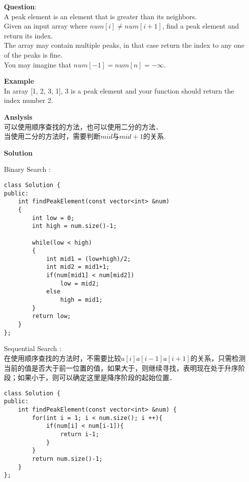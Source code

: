    
\begin{description}
    \item{\textbf{Question}}:\\%
		A peak element is an element that is greater than its neighbors.\\
		Given an input array where $num[i] \neq num[i+1]$, find a peak element and return its index.\\
		The array may contain multiple peaks, in that case return the index to any one of the peaks is fine.\\
		You may imagine that $num[-1] = num[n] = -∞$.
    \item{\textbf{Example}}\\
		In array [1, 2, 3, 1], 3 is a peak element and your function should return the index number 2.
    \item{\textbf{Anslysis}}\\
		可以使用顺序查找的方法，也可以使用二分的方法．\\
		当使用二分的方法时，需要判断$mid$与$mid + 1$的关系.\\

    \item{\textbf{Solution}}\\
	\item{Binary Search} : \\
		\begin{lstlisting}
class Solution {
public:
    int findPeakElement(const vector<int> &num) 
    {
        int low = 0;
        int high = num.size()-1;

        while(low < high)
        {
            int mid1 = (low+high)/2;
            int mid2 = mid1+1;
            if(num[mid1] < num[mid2])
                low = mid2;
            else
                high = mid1;
        }
        return low;
    }
};
		\end{lstlisting}

	\item{Sequential Search} : \\
		在使用顺序查找的方法时，不需要比较$a[i] a[i-1] a[i+1]$的关系，只需检测当前的值是否大于前一位置的值，如果大于，则继续寻找，表明现在处于升序阶段；如果小于，则可以确定这里是降序阶段的起始位置．\\
		\begin{lstlisting}
class Solution {
public:
    int findPeakElement(const vector<int> &num) {
        for(int i = 1; i < num.size(); i ++){
            if(num[i] < num[i-1]){
                return i-1;
            }
        }
        return num.size()-1;
    }
};
		\end{lstlisting}

\end{description}

